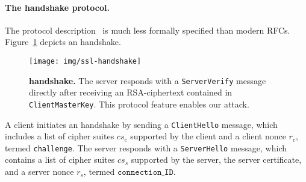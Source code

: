 



\paragraph{The \ssltwo handshake protocol.}
\label{sec:ssl2}
The \ssltwo protocol description~\cite{SSLv2}  is much less formally specified than modern RFCs. Figure~\ref{fig:ssl-handshake} depicts an \ssltwo handshake.
%
\begin{figure}
	\texttt{[image: img/ssl-handshake]} 
	\caption{\textbf{\ssltwo handshake.} The server responds with a \texttt{ServerVerify} message directly after receiving an RSA-\PKCS ciphertext contained in \texttt{ClientMasterKey}. This protocol feature enables our attack.}
	\label{fig:ssl-handshake}
\end{figure}
%
A client initiates an \ssltwo handshake by sending a
\texttt{ClientHello} message, which includes a list of cipher
suites $cs_c$ supported by the client and a client nonce $r_c$,
termed \texttt{challenge}.
The server responds with a \texttt{ServerHello} message, which
contains a list of cipher suites $cs_s$ supported by the server,
the server certificate, and a server nonce $r_s$, termed
$\texttt{connection\_ID}$.

